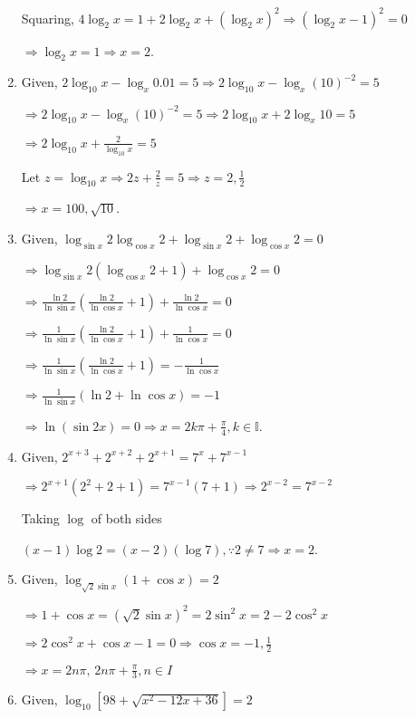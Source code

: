 \begin{enumerate}
  Squaring, $4\log_2x = 1 + 2\log_2x + (\log_2x)^2 \Rightarrow (\log_2x - 1)^2 = 0$

  $\Rightarrow \log_2x = 1 \Rightarrow x = 2$.
\item Given, $2\log_{10}x - \log_x0.01 = 5 \Rightarrow 2\log_{10}x - \log_x(10)^{-2} = 5$

  $\Rightarrow 2\log_{10}x - \log_x(10)^{-2} = 5 \Rightarrow 2\log_{10}x + 2\log_x10 = 5$

  $\Rightarrow 2\log_{10}x + \frac{2}{\log_{10}x} = 5$

  Let $z = \log_{10}x \Rightarrow 2z + \frac{2}{z} = 5 \Rightarrow z = 2, \frac{1}{2}$

  $\Rightarrow x = 100, \sqrt{10}$.
\item Given, $\log_{\sin x}2\log_{\cos x}2 + \log_{\sin x}2 + \log_{\cos x}2 = 0$

  $\Rightarrow \log_{\sin x}2(\log_{\cos x}2 + 1) + \log_{\cos x}2 = 0$

  $\Rightarrow \frac{\ln 2}{\ln \sin x}\left(\frac{\ln 2}{\ln \cos x} + 1\right) + \frac{\ln 2}{\ln \cos x} = 0$

  $\Rightarrow \frac{1}{\ln \sin x}\left(\frac{\ln 2}{\ln \cos x} + 1\right) + \frac{1}{\ln \cos x} = 0$

  $\Rightarrow \frac{1}{\ln \sin x}\left(\frac{\ln 2}{\ln \cos x} + 1\right) = -\frac{1}{\ln \cos x}$

  $\Rightarrow \frac{1}{\ln \sin x}(\ln 2 + \ln\cos x) = -1$

  $\Rightarrow \ln(\sin2x) = 0\Rightarrow x = 2k\pi + \frac{\pi}{4}, k\in\mathbb{I}$.
\item Given, $2^{x + 3} + 2^{x+2} + 2^{x + 1} = 7^x + 7^{x - 1}$

  $\Rightarrow 2^{x + 1}(2^2 + 2 + 1) = 7^{x - 1}(7 + 1) \Rightarrow 2^{x - 2} = 7^{x - 2}$

  Taking $\log$ of both sides

  $(x - 1)\log 2 = (x - 2)(\log 7), \because 2\neq 7 \Rightarrow x = 2$.
\item Given, $\log_{\sqrt{2}\sin x}(1 + \cos x) = 2$

  $\Rightarrow 1 + \cos x = (\sqrt{2}\sin x)^2 = 2\sin^2x = 2 - 2\cos^2 x$

  $\Rightarrow 2\cos^2x + \cos x - 1 = 0 \Rightarrow \cos x = -1, \frac{1}{2}$

  $\Rightarrow x = 2n\pi,\,2n\pi + \frac{\pi}{3}, n\in I$
\item Given, $\log_{10}[98 + \sqrt{x^2 - 12x + 36}] = 2$


\end{enumerate}
